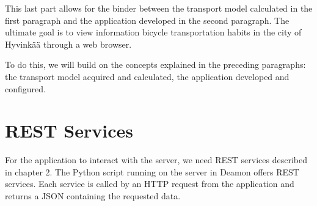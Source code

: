 

This last part allows for the binder between the transport model calculated in the first paragraph and the application developed in the second paragraph. The ultimate goal is to view information bicycle transportation habits in the city of Hyvinkää through a web browser. 

To do this, we will build on the concepts explained in the preceding paragraphs: the transport model acquired and calculated, the application developed and configured.


\section{REST Services}



For the application to interact with the server, we need REST services described in chapter 2. The Python script running on the server in Deamon offers REST services. Each service is called by an HTTP request from the application and returns a JSON containing the requested data.

